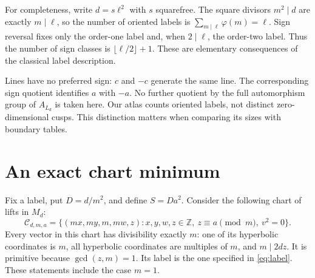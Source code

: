 \documentclass[11pt]{article}
\theoremstyle{remark}\newtheorem{remark}[theorem]{Remark}
\newcommand{\Z}{\mathbb Z}\newcommand{\Q}{\mathbb Q}\newcommand{\R}{\mathbb R}
\begin{document}
For completeness, write $d=s\ell^2$ with $s$ squarefree. The square divisors $m^2\mid d$ are exactly $m\mid\ell$, so the number of oriented labels is $\sum_{m\mid\ell}\varphi(m)=\ell$. Sign reversal fixes only the order-one label and, when $2\mid\ell$, the order-two label. Thus the number of sign classes is $\lfloor\ell/2\rfloor+1$. These are elementary consequences of the classical label description.

Lines have no preferred sign: $c$ and $-c$ generate the same line. The corresponding sign quotient identifies $a$ with $-a$. No further quotient by the full automorphism group of $A_{L_d}$ is taken here. Our atlas counts oriented labels, not distinct zero-dimensional cusps. This distinction matters when comparing its sizes with boundary tables.

\section{An exact chart minimum}
Fix a label, put $D=d/m^2$, and define $S=Da^2$. Consider the following chart of lifts in $M_d$:
\begin{equation}\label{eq:chart}
 \mathcal C_{d,m,a}=\{(mx,my,m,mw,z):x,y,w,z\in\Z,\ z\equiv a\pmod m,\ v^2=0\}.
\end{equation}
Every vector in this chart has divisibility exactly $m$: one of its hyperbolic coordinates is $m$, all hyperbolic coordinates are multiples of $m$, and $m\mid2dz$. It is primitive because $\gcd(z,m)=1$. Its label is the one specified in \eqref{eq:label}. These statements include the case $m=1$.
\end{document}
